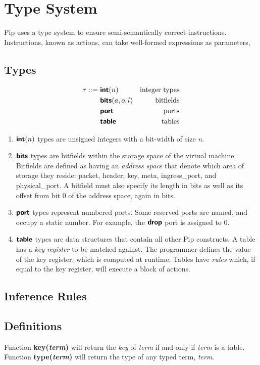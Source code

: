 
\section{Type System}
Pip uses a type system to ensure semi-semantically correct instructions. Instructions, known as actions, can take well-formed expressions as parameters, 

\subsection{Types}

\begin{align*}
\tau ::=~& \bm{\mathsf{{int}}}(n)        & \text{integer types} \\
         & \bm{\mathsf{{bits}}}(a, o, l) & \text{bitfields} \\
         & \bm{\mathsf{{port}}}          & \text{ports} \\
         & \bm{\mathsf{{table}}}         & \text{tables} \\
\end{align*}

\begin{enumerate}
\item $\bm{\mathsf{{int}}}(n)$ types are unsigned integers with a bit-width of size \textit{n}.
\item $\bm{\mathsf{{bits}}}$ types are bitfields within the storage space of the virtual machine. Bitfields are defined as having an \textit{address space} that denote which area of storage they reside: packet, header, key, meta, ingress\_port, and physical\_port. A bitfield must also specify its length in bits as well as its offset from bit 0 of the address space, again in bits.
\item $\bm{\mathsf{{port}}}$ types represent numbered ports. Some reserved ports are named, and occupy a static number. For example, the $\bm{\mathsf{{drop}}}$ port is assigned to 0.
\item $\bm{\mathsf{{table}}}$ types are data structures that contain all other Pip constructs. A table has a \textit{key register} to be matched against. The programmer defines the value of the key register, which is computed at runtime. Tables have \textit{rules} which, if equal to the key register, will execute a block of actions.
\end{enumerate}

\subsection{Inference Rules}
\subsection{Definitions}
Function \textbf{key(\textit{term})} will return the \textit{key} of \textit{term} if and only if \textit{term} is a table. \\
Function \textbf{type(\textit{term})} will return the type of any typed term, \textit{term}.

